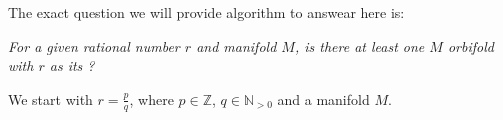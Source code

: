 The exact question we will provide algorithm to answear here is: 

\textit{For a given rational number $r$ and manifold $M$, is there at least one 
$M$ orbifold with $r$ as its \Eoc?}


We start with $r=\frac{p}{q}$, where $p \in \mathbb{Z}$, $q \in \mathbb{N}_{>0}$ and a manifold $M$. 

